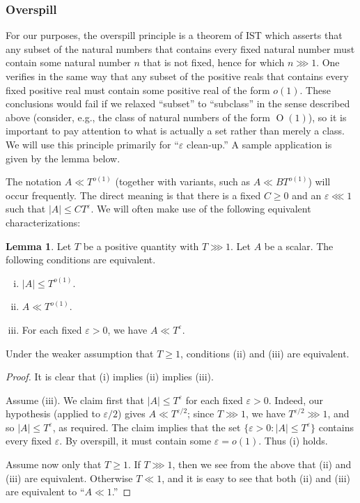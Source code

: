 \documentclass[reqno]{amsart}
\def\eps{\varepsilon}
\def\O{\operatorname{O}}
\theoremstyle{plain} \newtheorem{theorem} {Theorem}
\theoremstyle{definition} \newtheorem{definition} [theorem] {Definition}
\theoremstyle{itplain} %
\newtheorem{lemma}[theorem]{Lemma}
\numberwithin{equation}{section}
\numberwithin{theorem}{section}
\renewcommand{\geq}{\geqslant}
\renewcommand{\leq}{\leqslant}
\begin{document}
\subsubsection{Overspill}
For our purposes, the overspill principle is a theorem of IST \cite[Thm 1.1]{MR469763} which asserts that any subset of the natural numbers that contains every fixed natural number must contain some natural number $n$ that is not fixed, hence for which $n \ggg 1$.  One verifies in the same way that any subset of the positive reals that contains every fixed positive real must contain some positive real of the form $o(1)$.  These conclusions would fail if we relaxed ``subset'' to ``subclass'' in the sense described above (consider, e.g., the class of natural numbers of the form $\O(1)$), so it is important to pay attention to what is actually a set rather than merely a class.  We will use this principle primarily for ``$\eps$ clean-up.''  A sample application is given by the lemma below.

The notation $A \ll T^{o(1)}$ (together with variants, such as $A \ll B T^{o(1)}$) will occur frequently.  The direct meaning is that there is a fixed $C \geq 0$ and an $\eps \lll 1$ such that $|A| \leq C T^{\eps}$.  We will often make use of the following equivalent characterizations:
\begin{lemma}\label{lem:overspill-A-vs-T-eps}
  Let $T$ be a positive quantity with $T \ggg 1$.  Let $A$ be a scalar.  The following conditions are equivalent.
  \begin{enumerate}[(i)]
  \item $|A| \leq T^{o(1)}$.
  \item $A \ll T^{o(1)}$.
  \item For each fixed $\eps > 0$, we have $A \ll T^{\eps}$.
  \end{enumerate}
  Under the weaker assumption that $T \geq 1$, conditions (ii) and (iii) are equivalent.
\end{lemma}
\begin{proof}
  It is clear that (i) implies (ii) implies (iii).

  Assume (iii).  We claim first that $|A| \leq T^\eps$ for each fixed $\eps > 0$.  Indeed, our hypothesis (applied to $\eps/2$) gives $A \ll T^{\eps/2}$; since $T \ggg 1$, we have $T^{\eps/2} \ggg 1$, and so $|A| \leq T^{\eps}$, as required.  The claim implies that the set $\{\eps > 0 : |A| \leq T^{\eps}\}$ contains every fixed $\eps$.  By overspill, it must contain some $\eps  = o(1)$.  Thus (i) holds.

  Assume now only that $T \geq 1$.  If $T \ggg 1$, then we see from the above that (ii) and (iii) are equivalent.  Otherwise $T \ll 1$, and it is easy to see that both (ii) and (iii) are equivalent to ``$A \ll 1$.''
\end{proof}
\end{document}
